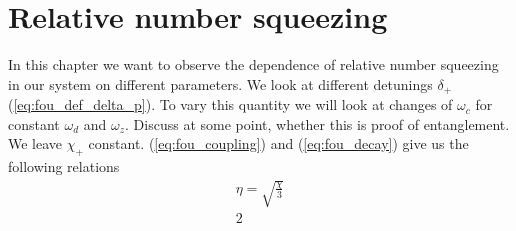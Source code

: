 \section{Relative number squeezing}\label{sec:relative_number_squeezing}
In this chapter we want to observe the dependence of relative number squeezing in our system on different parameters. We look at different detunings $\delta_+$ (\ref{eq:fou_def_delta_p}). To vary this quantity we will look at changes of $\omega_c$ for constant $\omega_d$ and $\omega_z$. Discuss at some point, whether this is proof of entanglement.
We leave $\chi_+$ constant. (\ref{eq:fou_coupling}) and (\ref{eq:fou_decay}) give us the following relations
\begin{align}
	\eta = \sqrt{\frac{\chi}{3}}
	\\
	2
\end{align}